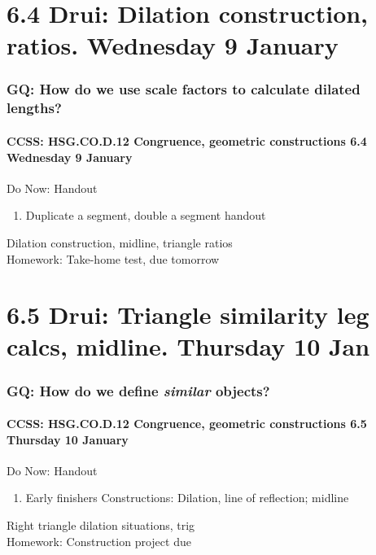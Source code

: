 \documentclass{beamer}
\begin{document}
\section{6.4 Drui: Dilation construction, ratios. Wednesday 9 January}
  \frame
  {
    \frametitle{GQ: How do we use scale factors to calculate dilated lengths?}
    \framesubtitle{CCSS: HSG.CO.D.12 Congruence, geometric constructions  \alert{6.4 Wednesday 9 January}}

    \begin{block}{Do Now: Handout}
      \begin{enumerate}
        \item Duplicate a segment, double a segment handout
      \end{enumerate}
    \end{block}
    Dilation construction, midline, triangle ratios\\[0.5cm]
    Homework: Take-home test, due tomorrow
  }

\section{6.5 Drui: Triangle similarity leg calcs, midline. Thursday 10 Jan}
  \frame
  {
    \frametitle{GQ: How do we define \emph{similar} objects?}
    \framesubtitle{CCSS: HSG.CO.D.12 Congruence, geometric constructions  \alert{6.5 Thursday 10 January}}

    \begin{block}{Do Now: Handout}
      \begin{enumerate}
        \item Early finishers Constructions: Dilation, line of reflection; midline
      \end{enumerate}
    \end{block}
    Right triangle dilation situations, trig\\
    Homework: Construction project due\\
  }
\end{document}
